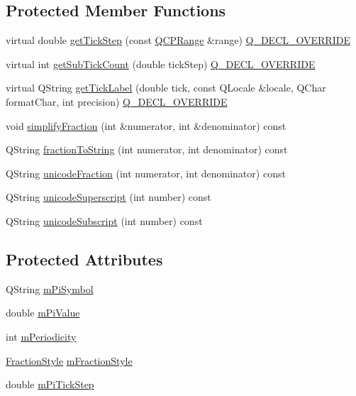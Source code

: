 \subsection*{Protected Member Functions}
\begin{DoxyCompactItemize}
\item 
virtual double \hyperlink{class_q_c_p_axis_ticker_pi_a55301f0072983bd2d7c131a24e1779e7}{get\+Tick\+Step} (const \hyperlink{class_q_c_p_range}{Q\+C\+P\+Range} \&range) \hyperlink{qcustomplot_8h_a42cc5eaeb25b85f8b52d2a4b94c56f55}{Q\+\_\+\+D\+E\+C\+L\+\_\+\+O\+V\+E\+R\+R\+I\+DE}
\item 
virtual int \hyperlink{class_q_c_p_axis_ticker_pi_a56c90f870da97c8670cfae4d04ff3ac7}{get\+Sub\+Tick\+Count} (double tick\+Step) \hyperlink{qcustomplot_8h_a42cc5eaeb25b85f8b52d2a4b94c56f55}{Q\+\_\+\+D\+E\+C\+L\+\_\+\+O\+V\+E\+R\+R\+I\+DE}
\item 
virtual Q\+String \hyperlink{class_q_c_p_axis_ticker_pi_a9a087d931d4344b8a91d5cecceff7109}{get\+Tick\+Label} (double tick, const Q\+Locale \&locale, Q\+Char format\+Char, int precision) \hyperlink{qcustomplot_8h_a42cc5eaeb25b85f8b52d2a4b94c56f55}{Q\+\_\+\+D\+E\+C\+L\+\_\+\+O\+V\+E\+R\+R\+I\+DE}
\item 
void \hyperlink{class_q_c_p_axis_ticker_pi_a0e30609aed5025d331cb61671f0115d0}{simplify\+Fraction} (int \&numerator, int \&denominator) const
\item 
Q\+String \hyperlink{class_q_c_p_axis_ticker_pi_afb59d434358173eb5b58e41255bea904}{fraction\+To\+String} (int numerator, int denominator) const
\item 
Q\+String \hyperlink{class_q_c_p_axis_ticker_pi_ade6f7e49238e986e9aed74178a78d8d3}{unicode\+Fraction} (int numerator, int denominator) const
\item 
Q\+String \hyperlink{class_q_c_p_axis_ticker_pi_a34798972670b3760d649ccfe0d0ee9a5}{unicode\+Superscript} (int number) const
\item 
Q\+String \hyperlink{class_q_c_p_axis_ticker_pi_a5b3bb340adb888a30a96225e1ca23c7a}{unicode\+Subscript} (int number) const
\end{DoxyCompactItemize}
\subsection*{Protected Attributes}
\begin{DoxyCompactItemize}
\item 
Q\+String \hyperlink{class_q_c_p_axis_ticker_pi_a0962084571116e4d98e4dccc2e68f5ea}{m\+Pi\+Symbol}
\item 
double \hyperlink{class_q_c_p_axis_ticker_pi_ab3e899a3d23ada89eb48b465204b09ea}{m\+Pi\+Value}
\item 
int \hyperlink{class_q_c_p_axis_ticker_pi_af5372570aa91ef3b0586939d91c119db}{m\+Periodicity}
\item 
\hyperlink{class_q_c_p_axis_ticker_pi_a262f1534c7f0c79a7d5237f5d1e2c54c}{Fraction\+Style} \hyperlink{class_q_c_p_axis_ticker_pi_a34db3e41fbc1e91426841ca040930595}{m\+Fraction\+Style}
\item 
double \hyperlink{class_q_c_p_axis_ticker_pi_a943706b7796d778c62915498864bbeb8}{m\+Pi\+Tick\+Step}
\end{DoxyCompactItemize}


